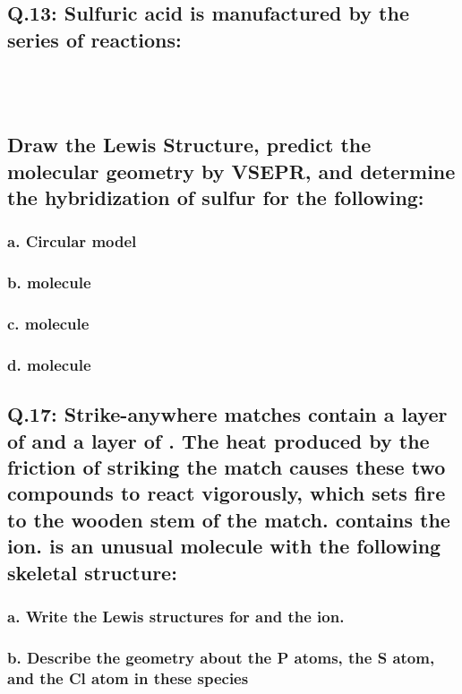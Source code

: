 \documentclass[11pt, letterpaper]{article}
\begin{document}
\subsection*{Q.13: Sulfuric acid is manufactured by the series of reactions:\\
\\
\\
\\
Draw the Lewis Structure, predict the molecular geometry by VSEPR,
and determine the hybridization of sulfur for the following:}

\subsubsection*{a. Circular  model}

\subsubsection*{b.  molecule}

\subsubsection*{c.  molecule}

\subsubsection*{d.  molecule}


\subsection*{Q.17: Strike-anywhere matches contain a layer of  and a
layer of .
The heat produced by the friction of striking the match causes these two compounds
to react vigorously, which sets fire to the wooden stem of the match.
 contains the  ion.
 is an unusual molecule with the following skeletal structure:}


\subsubsection*{a. Write the Lewis structures for  and the  ion.}

\subsubsection*{b. Describe the geometry about the P atoms, the S atom, and the Cl atom in these species}
\end{document}
